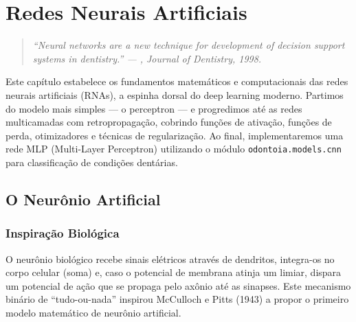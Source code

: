 
\chapter{Redes Neurais Artificiais}
\label{cap:redes-neurais}

\niveltres

\begin{quote}
\itshape\small
``Neural networks are a new technique for development of decision support systems in dentistry.'' --- , Journal of Dentistry, 1998.
\end{quote}

Este capítulo estabelece os fundamentos matemáticos e computacionais das redes neurais
artificiais (RNAs), a espinha dorsal do deep learning moderno. Partimos do modelo mais
simples --- o perceptron --- e progredimos até as redes multicamadas com retropropagação,
cobrindo funções de ativação, funções de perda, otimizadores e técnicas de regularização.
Ao final, implementaremos uma rede MLP (Multi-Layer Perceptron) utilizando o módulo
\texttt{odontoia.models.cnn} para classificação de condições dentárias.


\section{O Neurônio Artificial}
\label{sec:neuronio-artificial}

\subsection{Inspiração Biológica}

O neurônio biológico recebe sinais elétricos através de dendritos, integra-os no corpo
celular (soma) e, caso o potencial de membrana atinja um limiar, dispara um potencial
de ação que se propaga pelo axônio até as sinapses. Este mecanismo binário de
``tudo-ou-nada'' inspirou McCulloch e Pitts (1943) a propor o primeiro modelo
matemático de neurônio artificial.


